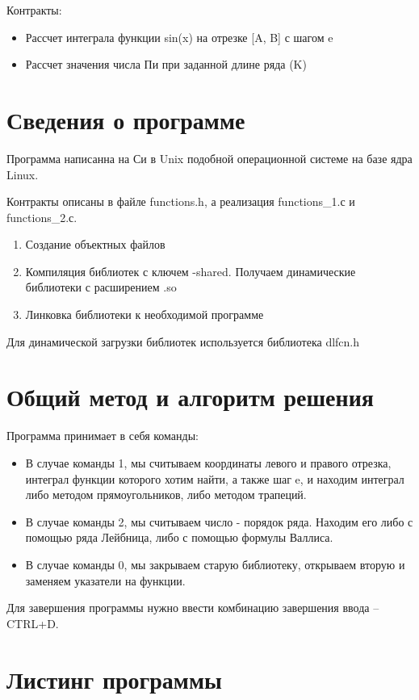\documentclass[pdf, unicode, 12pt, a4paper,oneside,fleqn]{article}
\begin{document}
Контракты:
\begin{itemize}
    \item Рассчет интеграла функции sin(x) на отрезке [A, B] с шагом e
    \item Рассчет значения числа Пи при заданной длине ряда (K)
\end{itemize}

\section{Сведения о программе}

Программа написанна на Си в Unix подобной операционной системе на базе ядра Linux.

Контракты описаны в файле functions.h, а реализация functions\_1.с и functions\_2.с.

\begin{enumerate}
    \item Создание объектных файлов
    \item Компиляция библиотек с ключем -shared. Получаем динамические библиотеки с расширением .so 
    \item Линковка библиотеки к необходимой программе
\end{enumerate}

Для динамической загрузки библиотек используется библиотека dlfcn.h

\section{Общий метод и алгоритм решения}

Программа принимает в себя команды: 
\begin{itemize}
    \item В случае команды 1, мы считываем координаты левого и правого отрезка, интеграл функции которого хотим найти, а также шаг e, и находим интеграл либо методом прямоугольников, либо методом трапеций.
    \item В случае команды 2, мы считываем число - порядок ряда. Находим его либо с помощью ряда Лейбница, либо с помощью формулы Валлиса.
    \item В случае команды 0, мы закрываем старую библиотеку, открываем вторую и заменяем указатели на функции.
\end{itemize}

Для завершения программы нужно ввести комбинацию завершения ввода \--- CTRL+D.

\section{Листинг программы}
\end{document}
